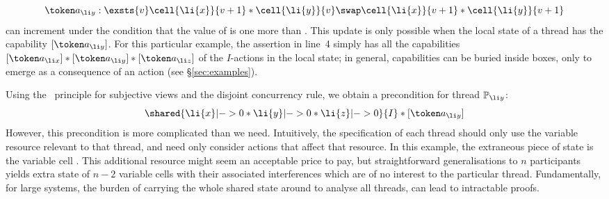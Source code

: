   \vspace{-1ex}
\[
  \vspace{-1ex}
 \token a_{\li y}:  \exsts{v} \cell{\li{x}}{v+1} * \cell{\li{y}}{v} \swap 
 \cell{\li{x}}{v+1} * \cell{\li{y}}{v+1}
\]
can increment  under the condition that the
value of  is one more than . 
This update is only possible when the
local state of a thread has the { capability} $[\token a_{\li y}]$. For  this
particular 
example, the assertion in line~4 simply has all the capabilities $[\token
a_{\li x}] * [\token a_{\li y}] * [\token a_{\li z}]$ of the $I$-actions   in the local state; in general,
capabilities can be buried inside boxes, only to emerge as a
consequence of an action
(see \S\ref{sec:examples}). 



Using the 
\copyRule\ principle for subjective views and the disjoint concurrency
rule, we obtain a  precondition for thread $\mathbb{P}_{\li y}$:
  \vspace{-1ex}
\[
  \vspace{-1ex}
\shared{\li{x}|-> 0 * \li{y}|->0 * \li{z}|-> 0}{I} *[\token a_{\li y}]
\]
However, this precondition is more complicated than we
need. Intuitively, the specification of each thread should only use
the variable resource relevant to that thread, and need only consider actions
that affect that resource.  In this example, the extraneous piece of
state is the variable cell  . This additional resource  might seem an acceptable
price to pay, but straightforward generalisations to $n$ participants
yields extra state of $n-2$ variable cells with their associated
interferences which are of no interest to the particular thread.
Fundamentally, for large systems, the burden of carrying the whole
shared state around to analyse all threads,  can lead to intractable proofs.

